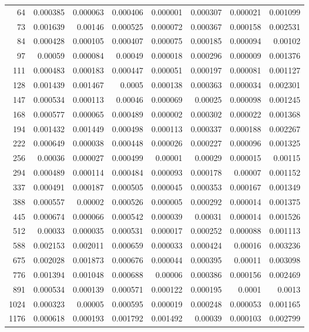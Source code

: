 \begin{longtable}{r r r r r r r r}
64 & 0.000385 & 0.000063 & 0.000406 & 0.000001 & 0.000307 & 0.000021 & 0.001099 \\
73 & 0.001639 & 0.00146 & 0.000525 & 0.000072 & 0.000367 & 0.000158 & 0.002531 \\
84 & 0.000428 & 0.000105 & 0.000407 & 0.000075 & 0.000185 & 0.000094 & 0.00102 \\
97 & 0.00059 & 0.000084 & 0.00049 & 0.000018 & 0.000296 & 0.000009 & 0.001376 \\
111 & 0.000483 & 0.000183 & 0.000447 & 0.000051 & 0.000197 & 0.000081 & 0.001127 \\
128 & 0.001439 & 0.001467 & 0.0005 & 0.000138 & 0.000363 & 0.000034 & 0.002301 \\
147 & 0.000534 & 0.000113 & 0.00046 & 0.000069 & 0.00025 & 0.000098 & 0.001245 \\
168 & 0.000577 & 0.000065 & 0.000489 & 0.000002 & 0.000302 & 0.000022 & 0.001368 \\
194 & 0.001432 & 0.001449 & 0.000498 & 0.000113 & 0.000337 & 0.000188 & 0.002267 \\
222 & 0.000649 & 0.000038 & 0.000448 & 0.000026 & 0.000227 & 0.000096 & 0.001325 \\
256 & 0.00036 & 0.000027 & 0.000499 & 0.00001 & 0.00029 & 0.000015 & 0.00115 \\
294 & 0.000489 & 0.000114 & 0.000484 & 0.000093 & 0.000178 & 0.00007 & 0.001152 \\
337 & 0.000491 & 0.000187 & 0.000505 & 0.000045 & 0.000353 & 0.000167 & 0.001349 \\
388 & 0.000557 & 0.00002 & 0.000526 & 0.000005 & 0.000292 & 0.000014 & 0.001375 \\
445 & 0.000674 & 0.000066 & 0.000542 & 0.000039 & 0.00031 & 0.000014 & 0.001526 \\
512 & 0.00033 & 0.000035 & 0.000531 & 0.000017 & 0.000252 & 0.000088 & 0.001113 \\
588 & 0.002153 & 0.002011 & 0.000659 & 0.000033 & 0.000424 & 0.00016 & 0.003236 \\
675 & 0.002028 & 0.001873 & 0.000676 & 0.000044 & 0.000395 & 0.00011 & 0.003098 \\
776 & 0.001394 & 0.001048 & 0.000688 & 0.00006 & 0.000386 & 0.000156 & 0.002469 \\
891 & 0.000534 & 0.000139 & 0.000571 & 0.000122 & 0.000195 & 0.0001 & 0.0013 \\
1024 & 0.000323 & 0.00005 & 0.000595 & 0.000019 & 0.000248 & 0.000053 & 0.001165 \\
1176 & 0.000618 & 0.000193 & 0.001792 & 0.001492 & 0.00039 & 0.000103 & 0.002799 \\

\end{longtable}
